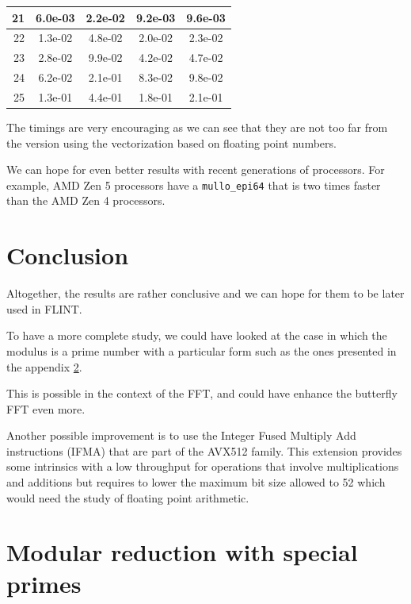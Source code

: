 \documentclass[a4paper]{article}
\begin{document}
\begin{center}
\begin{longtable}{|r|*{4}{c|}}
        \hline
        \cellcolor{myGray} 21 & 6.0e-03 & 2.2e-02 & 9.2e-03 & 9.6e-03 \\
        \hline
        \cellcolor{myGray} 22 & 1.3e-02 & 4.8e-02 & 2.0e-02 & 2.3e-02 \\
        \hline
        \cellcolor{myGray} 23 & 2.8e-02 & 9.9e-02 & 4.2e-02 & 4.7e-02 \\
        \hline
        \cellcolor{myGray} 24 & 6.2e-02 & 2.1e-01 & 8.3e-02 & 9.8e-02 \\
        \hline
        \cellcolor{myGray} 25 & 1.3e-01 & 4.4e-01 & 1.8e-01 & 2.1e-01 \\
        \hline
    \end{longtable}
\end{center}

The timings are very encouraging as we can see that they are not too far from the version using the vectorization
based on floating point numbers.

We can hope for even better results with recent generations of processors. For example, AMD Zen 5 processors
have a \texttt{mullo\_epi64} that is two times faster than the AMD Zen 4 processors.

\section{Conclusion}

Altogether, the results are rather conclusive and we can hope for them to be later used in FLINT. 

\bigskip
To have a more complete study, we could have looked at the case in which the modulus is a prime number
with a particular form such as the ones presented in the appendix \ref{app}. 

This is possible in the context of the FFT, and could have enhance the butterfly FFT even more.

\bigskip
Another possible improvement is to use the Integer Fused Multiply Add instructions (IFMA) that are part of
the AVX512 family. This extension provides some intrinsics with a low throughput for operations that involve
multiplications and additions but requires to lower the maximum bit size allowed to 52 which would need the
study of floating point arithmetic.


\newpage
 
 
\nocite{*}


\newpage
\appendix
\section{Modular reduction with special primes} \label{app}
\end{document}

